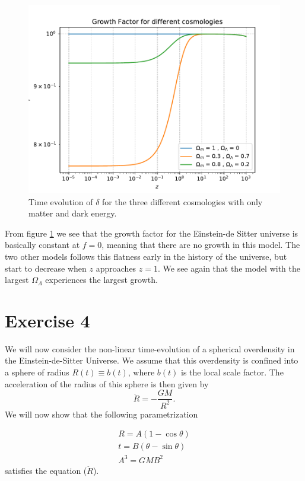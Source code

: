 \documentclass[a4paper]{article}
\begin{document}
\begin{figure}[h]
  \centering
  \includegraphics[width=0.9\linewidth]{growth.pdf}
  \caption{Time evolution of $\delta$ for the three different cosmologies with only matter and dark energy.}
  \label{fig:2}
\end{figure}
From figure \ref{fig:2} we see that the growth factor for the Einstein-de Sitter universe is basically constant at $f = 0$, meaning that there are no growth in this model. The two other models follows this flatness early in the history of the universe, but start to decrease when $z$ approaches $z =1$. We see again that the model with the largest $\Omega_\Lambda$ experiences the largest growth.
\section*{Exercise 4}

We will now consider the non-linear time-evolution of a spherical overdensity in the Einstein-de-Sitter Universe. We assume that this overdensity is confined into a sphere of radius $R(t) \equiv b(t)$, where $b(t)$ is the local scale factor. The acceleration of the radius of this sphere is then given by
\begin{equation}
    \ddot{R} = - \frac{GM}{R^2}.
\end{equation}
We will now show that the following parametrization 

\begin{align}
    R = A(1 - \cos \theta)\\
    t = B(\theta - \sin \theta)\\
    A^3 = GMB^2
\end{align}
satisfies the equation ($\ddot{R}$).
\end{document}
